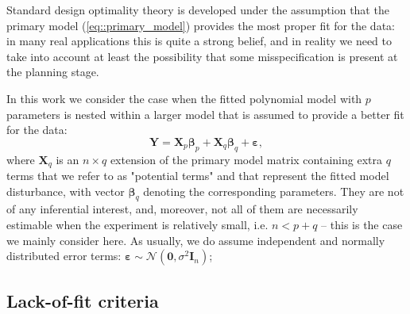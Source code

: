 
Standard design optimality theory is developed under the assumption that the primary model (\ref{eq::primary_model}) provides the most proper fit for the data: in many real applications this is quite a strong belief, and in reality we need to take into account at least the possibility that some misspecification is present at the planning stage.

In this work we consider the case when the fitted polynomial model with $p$ parameters is nested within a larger model that is assumed to provide a better fit for the data:
\begin{equation}
\label{eq::full_model}
\bm{Y}=\bm{X}_p\bm{\beta}_p+\bm{X}_q\bm{\beta}_q+\bm{\varepsilon},
\end{equation}
where $\bm{X}_q$ is an $n\times q$ extension of the primary model matrix containing extra $q$  terms that we refer to as "potential terms" and that represent the fitted model disturbance, with vector $\bm{\beta}_q$ denoting the corresponding parameters. They are not of any inferential interest, and, moreover, not all of them are necessarily estimable when the experiment is relatively small, i.e. $n<p+q$ -- this is the case we mainly consider here. As usually, we do assume independent and normally distributed error terms: $\bm{\varepsilon}\sim \mathcal{N}(\bm{0},\sigma^{2}\bm{I}_{n})$; 

\subsection{Lack-of-fit criteria}
 

